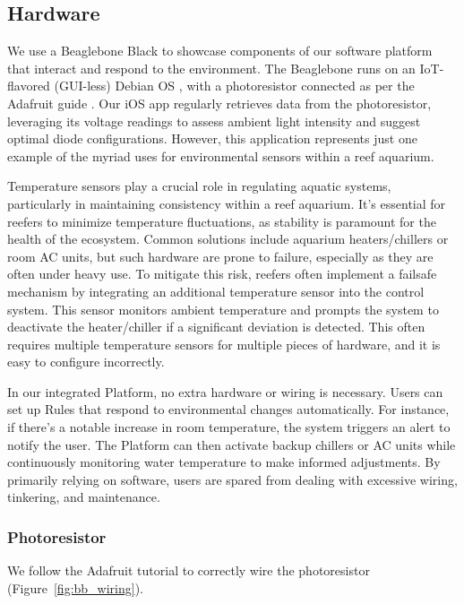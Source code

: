 \documentclass[8pt,twocolumn]{article}
\newcommand{\xssub}[1]{\bigskip\noindent{\small\textbf{#1}}\smallskip}
\begin{document}
\subsection{Hardware}

We use a Beaglebone Black to showcase components of our software platform that interact and respond to the environment. The Beaglebone runs on an IoT-flavored (GUI-less) Debian OS \cite{openthread_bb}, with a photoresistor connected as per the Adafruit guide \cite{adafruit}. Our iOS app regularly retrieves data from the photoresistor, leveraging its voltage readings to assess ambient light intensity and suggest optimal diode configurations. However, this application represents just one example of the myriad uses for environmental sensors within a reef aquarium.

\xssub{Example: Temperature Sensor}

\noindent Temperature sensors play a crucial role in regulating aquatic systems, particularly in maintaining consistency within a reef aquarium. It's essential for reefers to minimize temperature fluctuations, as stability is paramount for the health of the ecosystem. Common solutions include aquarium heaters/chillers or room AC units, but such hardware are prone to failure, especially as they are often under heavy use. To mitigate this risk, reefers often implement a failsafe mechanism by integrating an additional temperature sensor into the control system. This sensor monitors ambient temperature and prompts the system to deactivate the heater/chiller if a significant deviation is detected. This often requires multiple temperature sensors for multiple pieces of hardware, and it is easy to configure incorrectly.

In our integrated Platform, no extra hardware or wiring is necessary. Users can set up Rules that respond to environmental changes automatically. For instance, if there's a notable increase in room temperature, the system triggers an alert to notify the user. The Platform can then activate backup chillers or AC units while continuously monitoring water temperature to make informed adjustments. By primarily relying on software, users are spared from dealing with excessive wiring, tinkering, and maintenance.


\subsubsection{Photoresistor}

We follow the Adafruit tutorial to correctly wire the photoresistor (Figure~\ref{fig:bb_wiring}).
\end{document}
